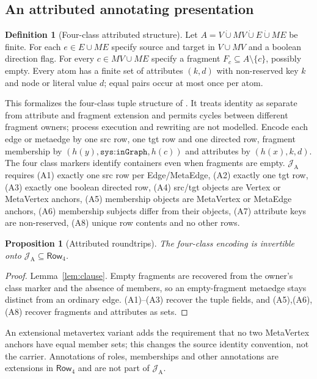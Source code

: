 \documentclass[11pt]{article}
\theoremstyle{plain}
\newtheorem{proposition}[theorem]{Proposition}
\theoremstyle{definition}
\newtheorem{definition}{Definition}
\theoremstyle{remark}
\newcommand{\sys}[1]{\texttt{sys:#1}}
\newcommand{\NF}[1]{\mathsf{Row}_{#1}}
\newcommand{\Img}[1]{\mathcal J_{\mathrm{#1}}}
\begin{document}
\subsection{An attributed annotating presentation}
\begin{definition}[Four-class attributed structure]\label{def:annot}
Let $A=V\mathbin{\dot\cup}MV\mathbin{\dot\cup}E\mathbin{\dot\cup}ME$ be finite.
For each $e\in E\cup ME$ specify source and target in $V\cup MV$ and a boolean direction
flag. For every $c\in MV\cup ME$ specify a fragment $F_c\subseteq A\setminus\{c\}$,
possibly empty. Every atom has a finite set of attributes $(k,d)$ with non-reserved key
$k$ and node or literal value $d$; equal pairs occur at most once per atom.
\end{definition}
This formalizes the four-class tuple structure of \cite{gapanyuk2021development}. It
treats identity as separate from attribute and fragment extension and permits cycles
between different fragment owners; process execution and rewriting are not modelled.
Encode each edge or metaedge by one src row, one tgt row and one directed row, fragment
membership by $(h(y),\sys{inGraph},h(c))$ and attributes by $(h(x),k,d)$. The four
class markers identify containers even when fragments are empty.
$\Img{A}$ requires
\textup{(A1)} exactly one src row per Edge/MetaEdge,
\textup{(A2)} exactly one tgt row,
\textup{(A3)} exactly one boolean directed row,
\textup{(A4)} src/tgt objects are Vertex or MetaVertex anchors,
\textup{(A5)} membership objects are MetaVertex or MetaEdge anchors,
\textup{(A6)} membership subjects differ from their objects,
\textup{(A7)} attribute keys are non-reserved,
\textup{(A8)} unique row contents and no other rows.
\begin{proposition}[Attributed roundtrips]\label{prop:annot}
The four-class encoding is invertible onto $\Img{A}\subseteq\NF4$.
\end{proposition}
\begin{proof}
Lemma~\ref{lem:clause}. Empty fragments are recovered from the owner's class marker and
the absence of members, so an empty-fragment metaedge stays distinct from an ordinary
edge. (A1)--(A3) recover the tuple fields, and (A5),(A6),(A8) recover fragments and
attributes as sets.
\end{proof}
An extensional metavertex variant adds the requirement that no two MetaVertex anchors
have equal member sets; this changes the source identity convention, not the carrier.
Annotations of roles, memberships and other annotations are extensions in $\NF4$ and
are not part of $\Img{A}$.
\end{document}
